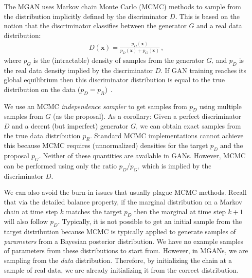 \documentclass{article}
\renewcommand{\vec}[1]{{\boldsymbol{\mathbf{#1}}}} %
\newcommand{\PG}{{p_G}}
\newcommand{\PD}{{p_D}}
\newcommand{\PR}{{p_R}}
\begin{document}
The MGAN uses Markov chain Monte Carlo (MCMC) methods to sample from the distribution implicitly defined by the discriminator $D$.
This is based on the notion that the discriminator classifies between the generator $G$ and a real data distribution:
\begin{align}
  D(\vec x) = \frac{\PD(\vec x)}{\PD(\vec x) + \PG(\vec x)}\,,
\end{align}
where $\PG$ is the (intractable) density of samples from the generator $G$, and $\PD$ is the real data density implied by the discriminator $D$.
If GAN training reaches its global equilibrium then this discriminator distribution is equal to the true distribution on the data ($\PD = \PR$)~\citep{Goodfellow2014}.

We use an MCMC \emph{independence sampler} to get samples from $\PD$ using multiple samples from $G$ (as the proposal)\@.
As a corollary: Given a perfect discriminator $D$ and a decent (but imperfect) generator $G$, we can obtain exact samples from the true data distribution $\PR$.
Standard MCMC implementations cannot achieve this because MCMC requires (unnormalized) densities for the target $\PD$ and the proposal $\PG$.
Neither of these quantities are available in GANs.
However, MCMC can be performed using only the ratio $\PD / \PG$, which is implied by the discriminator $D$.

We can also avoid the burn-in issues that usually plague MCMC methods.
Recall that via the detailed balance property, if the marginal distribution on a Markov chain at time step $k$ matches the target $\PD$ then the marginal at time step $k+1$ will also follow $\PD$.
Typically, it is not possible to get an initial sample from the target distribution because MCMC is typically applied to generate samples of \emph{parameters} from a Bayesian posterior distribution.
We have no example samples of parameters from these distributions to start from.
However, in MGANs, we are sampling from the \emph{data} distribution.
Therefore, by initializing the chain at a sample of real data, we are already initializing it from the correct distribution.
\end{document}
